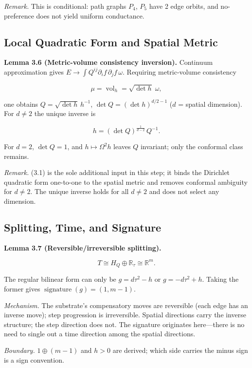 \documentclass[
  11pt,
]{article}
\begin{document}
\emph{Remark.} This is conditional: path graphs \(P_4\), \(P_5\) have 2
edge orbits, and no-preference does not yield uniform conductance.

\subsection{Local Quadratic Form and Spatial
Metric}\label{local-quadratic-form-and-spatial-metric}

\textbf{Lemma 3.6 (Metric-volume consistency inversion).} Continuum
approximation gives \(E\to\int Q^{ij}\partial_if\,\partial_jf\,\omega\).
Requiring metric-volume consistency

\[
\mu=\operatorname{vol}_h=\sqrt{\det h}\;\omega,
\tag{3.1}
\]

one obtains \(Q=\sqrt{\det h}\,h^{-1}\), \(\det Q=(\det h)^{d/2-1}\)
(\(d\) = spatial dimension). For \(d\neq2\) the unique inverse is

\[
h=(\det Q)^{\frac{1}{d-2}}\,Q^{-1}.
\tag{3.2}
\]

For \(d=2\), \(\det Q=1\), and \(h\mapsto\Omega^2h\) leaves \(Q\)
invariant; only the conformal class remains.

\emph{Remark.} (3.1) is the sole additional input in this step; it binds
the Dirichlet quadratic form one-to-one to the spatial metric and
removes conformal ambiguity for \(d\neq2\). The unique inverse holds for
all \(d\neq2\) and does not select any dimension.

\subsection{Splitting, Time, and
Signature}\label{splitting-time-and-signature}

\textbf{Lemma 3.7 (Reversible/irreversible splitting).}

\[
T\cong H_Q\oplus\mathbb R_\tau\cong\mathbb R^m.
\]

The regular bilinear form can only be \(g=d\tau^2-h\) or
\(g=-d\tau^2+h\). Taking the former gives
\(\operatorname{signature}(g)=(1,m-1)\).

\emph{Mechanism.} The substrate's compensatory moves are reversible
(each edge has an inverse move); step progression is irreversible.
Spatial directions carry the inverse structure; the step direction does
not. The signature originates here---there is no need to single out a
time direction among the spatial directions.

\emph{Boundary.} \(1\oplus(m-1)\) and \(h>0\) are derived; which side
carries the minus sign is a sign convention.
\end{document}
